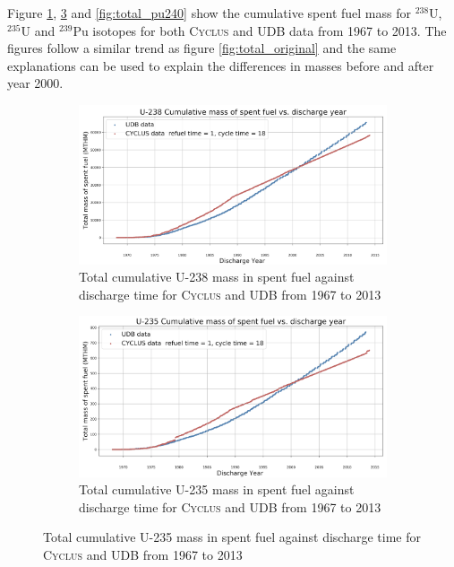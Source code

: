 \documentclass{anstrans}
\newcommand{\Cyclus}{\textsc{Cyclus}\xspace}%
\begin{document}
Figure \ref{fig:total_u238}, \ref{fig:total_u235} and \ref{fig:total_pu240} show the cumulative spent fuel mass for $^{238}$U, $^{235}$U and $^{239}$Pu isotopes for both \Cyclus and UDB data from 1967 to 2013.
The figures follow a similar trend as figure \ref{fig:total_original} and the same explanations can be used to explain the differences in masses before and after year 2000.  

\begin{figure}[h]
	\centering
	\begin{subfigure}[b]{0.45\textwidth}
		\centering
		\includegraphics[width=\textwidth]{U-238_cumulative_mass_spent_fuel_original}
		\caption[Network2]%
		{{\small Total cumulative U-238 mass in spent fuel against discharge time for \Cyclus and UDB from 1967 to 2013}}    
		\label{fig:total_u238}
	\end{subfigure}
	\hfill
	\begin{subfigure}[b]{0.45\textwidth}  
		\centering 
		\includegraphics[width=\textwidth]{U-235_cumulative_mass_spent_fuel_original}
		\caption[]%
		{{\small Total cumulative U-235 mass in spent fuel against discharge time for \Cyclus and UDB from 1967 to 2013}}    
		\label{fig:total_u235}
	\end{subfigure}

\end{figure}
\end{document}
